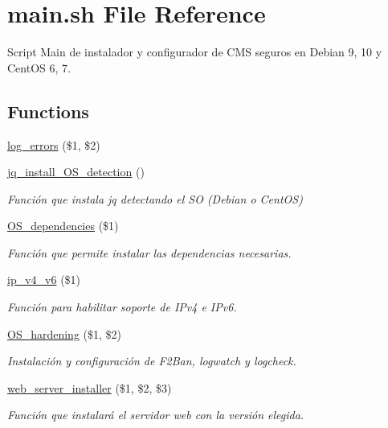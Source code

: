 \hypertarget{main_8sh}{}\section{main.\+sh File Reference}
\label{main_8sh}


Script Main de instalador y configurador de C\+MS seguros en Debian 9, 10 y Cent\+OS 6, 7.  


\subsection*{Functions}
\begin{DoxyCompactItemize}
\item 
\hyperlink{main_8sh_a92067b58a8478c9841b2cd9b75ea3565}{log\+\_\+errors} (\$1, \$2)
\item 
\mbox{\label{main_8sh_a14153ec632198b7643c2d2f1cff3471d}} 
\hyperlink{main_8sh_a14153ec632198b7643c2d2f1cff3471d}{jq\+\_\+install\+\_\+\+O\+S\+\_\+detection} ()
\begin{DoxyCompactList}\small\item\em Función que instala jq detectando el SO (Debian o Cent\+OS) \end{DoxyCompactList}\item 
\hyperlink{main_8sh_a48e8d18ccca665f9cd6bacd76dcd3d7d}{O\+S\+\_\+dependencies} (\$1)
\begin{DoxyCompactList}\small\item\em Función que permite instalar las dependencias necesarias. \end{DoxyCompactList}\item 
\hyperlink{main_8sh_ac44fe97312acf24ba3f09aa09c58cf5a}{ip\+\_\+v4\+\_\+v6} (\$1)
\begin{DoxyCompactList}\small\item\em Función para habilitar soporte de I\+Pv4 e I\+Pv6. \end{DoxyCompactList}\item 
\hyperlink{main_8sh_acd33682741fa52b482fbeb09846bd3cb}{O\+S\+\_\+hardening} (\$1, \$2)
\begin{DoxyCompactList}\small\item\em Instalación y configuración de F2\+Ban, logwatch y logcheck. \end{DoxyCompactList}\item 
\hyperlink{main_8sh_a8fbc4bde96d235c9985b0d1697e1b552}{web\+\_\+server\+\_\+installer} (\$1, \$2, \$3)
\begin{DoxyCompactList}\small\item\em Función que instalará el servidor web con la versión elegida. \end{DoxyCompactList}\item 

\end{DoxyCompactItemize}
